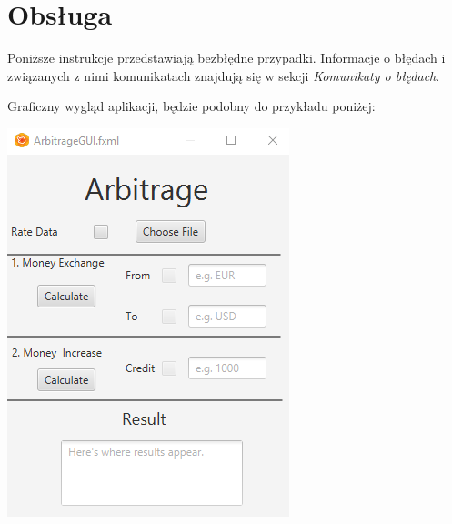 \documentclass[a4paper,11pt]{article}
\begin{document}
\section{Obsługa}
\qquad Poniższe instrukcje przedstawiają bezbłędne przypadki. Informacje o błędach i związanych z nimi komunikatach znajdują się w sekcji \textit{Komunikaty o błędach}.

Graficzny wygląd aplikacji, będzie podobny do przykładu poniżej:
\begin{center}
\includegraphics[scale=1]{ArbitrageGUI}
\end{center}
\end{document}
